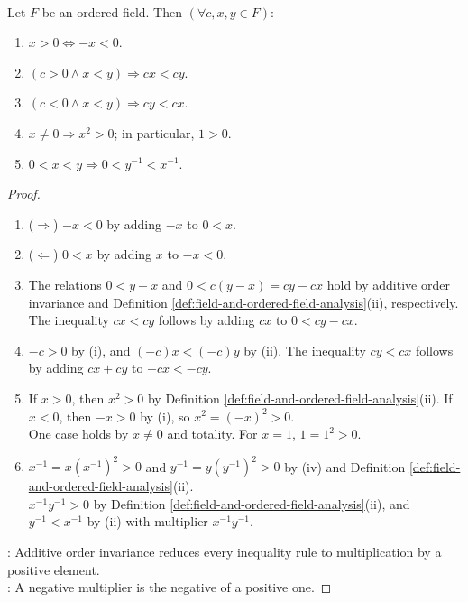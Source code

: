 \begin{proposition} \label{prop:ordered-field-inequality-rules-analysis} \\
Let $F$ be an ordered field. Then $(\forall c,x,y\in F)$:
\begin{enumerate}[label=(\roman*)]
\setlength{\itemsep}{0pt}
\item $x>0\Longleftrightarrow-x<0$.
\item $(c>0\land x<y)\Rightarrow cx<cy$.
\item $(c<0\land x<y)\Rightarrow cy<cx$.
\item $x\neq0\Rightarrow x^2>0$; in particular, $1>0$.
\item $0<x<y\Rightarrow0<y^{-1}<x^{-1}$.
\end{enumerate}
\begin{proof}
\begin{enumerate}[label=(\roman*)]
\setlength{\itemsep}{0pt}
\item[$(i)$] ($\Rightarrow$) $-x<0$ by adding $-x$ to $0<x$.
\item[$(i)$] ($\Leftarrow$) $0<x$ by adding $x$ to $-x<0$.
\item[$(ii)$] The relations $0<y-x$ and $0<c(y-x)=cy-cx$ hold by additive order invariance and Definition \ref{def:field-and-ordered-field-analysis}(ii), respectively.\\
The inequality $cx<cy$ follows by adding $cx$ to $0<cy-cx$.
\item[$(iii)$] $-c>0$ by (i), and $(-c)x<(-c)y$ by (ii). The inequality $cy<cx$ follows by adding $cx+cy$ to $-cx<-cy$.
\item[$(iv)$] If $x>0$, then $x^2>0$ by Definition \ref{def:field-and-ordered-field-analysis}(ii). If $x<0$, then $-x>0$ by (i), so $x^2=(-x)^2>0$.\\
One case holds by $x\neq0$ and totality. For $x=1$, $1=1^2>0$.
\item[$(v)$] $x^{-1}=x(x^{-1})^2>0$ and $y^{-1}=y(y^{-1})^2>0$ by (iv) and Definition \ref{def:field-and-ordered-field-analysis}(ii).\\
$x^{-1}y^{-1}>0$ by Definition \ref{def:field-and-ordered-field-analysis}(ii), and $y^{-1}<x^{-1}$ by (ii) with multiplier $x^{-1}y^{-1}$.
\end{enumerate}
: Additive order invariance reduces every inequality rule to multiplication by a positive element.\\
: A negative multiplier is the negative of a positive one.
\end{proof}
\end{proposition}

